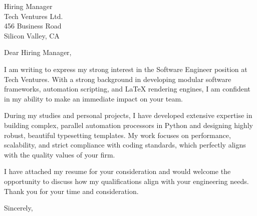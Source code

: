 \documentclass[11pt,a4paper]{letter}
\begin{document}
\begin{letter}{Hiring Manager \\ Tech Ventures Ltd. \\ 456 Business Road \\ Silicon Valley, CA}

\opening{Dear Hiring Manager,}

I am writing to express my strong interest in the Software Engineer position at Tech Ventures. With a strong background in developing modular software frameworks, automation scripting, and LaTeX rendering engines, I am confident in my ability to make an immediate impact on your team.

During my studies and personal projects, I have developed extensive expertise in building complex, parallel automation processors in Python and designing highly robust, beautiful typesetting templates. My work focuses on performance, scalability, and strict compliance with coding standards, which perfectly aligns with the quality values of your firm.

I have attached my resume for your consideration and would welcome the opportunity to discuss how my qualifications align with your engineering needs. Thank you for your time and consideration.

\closing{Sincerely,}

\end{letter}
\end{document}
